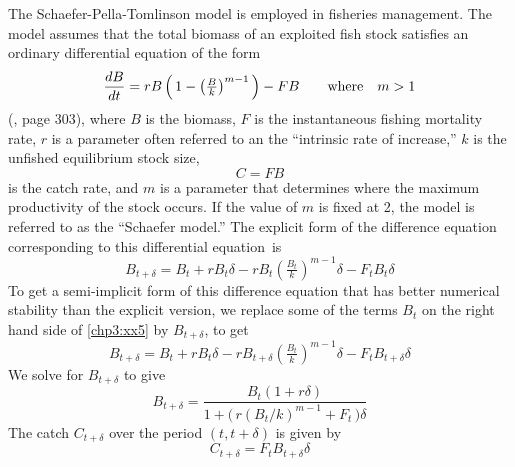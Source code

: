 \documentclass{admbmanual}
\begin{document}
The Schaefer-Pella-Tomlinson model is employed in fisheries management. The
model assumes that the total biomass of an exploited fish stock satisfies an
ordinary differential equation of the form
\begin{equation}
\frac{dB}{dt}=rB\left(\,1-\left(\tfrac{B}{k}\right)^{m-1}\,\right)
           - FB  \qquad \hbox{\rm where}\quad m>1
\label{chp3:xx3}
\end{equation}
(\cite{hilbornwalters1992}, page 303), where $B$ is the biomass, $F$ is the
instantaneous fishing mortality rate, $r$ is a parameter often referred to an
the ``intrinsic rate of increase,'' $k$ is the unfished equilibrium stock size,
\begin{equation}
  {C=FB}
\label{chp3:xx4}
\end{equation}
is the catch rate, and $m$ is a parameter that determines where the maximum
productivity of the stock occurs. If the value of $m$ is fixed at 2, the model
is referred to as the ``Schaefer model.'' The explicit form of the difference
equation corresponding to this differential equation~is
\begin{equation}
  {B_{t+\delta}=B_t+rB_t\delta-rB_t\left(\tfrac{B_t}{k}\right)^{m-1}\delta
     - F_tB_t\delta}
  \label{chp3:xx5}
\end{equation}
To get a semi-implicit form of this difference equation that has better
numerical stability than the explicit version, we replace some of the terms
$B_t$ on the right hand side of \ref{chp3:xx5} by $B_{t+\delta}$, to get
\begin{equation}
{B_{t+\delta}
   =B_t+rB_t\delta-rB_{t+\delta}\left(\tfrac{B_t}{k}\right)^{m-1}\delta
     - F_tB_{t+\delta}\delta}
 \label{chp3:xx6}
\end{equation}
We solve for $B_{t+\delta}$ to give
\begin{equation}
{B_{t+\delta}
   =\frac{B_t(1+r\delta)}{1+\big(\,r(B_t/k)^{m-1}+F_t\,\big)\delta}}
  \label{chp3:xx7}
\end{equation}
The catch $C_{t+\delta}$ over the period $(t,t+\delta)$ is given by
\begin{equation}
 {C_{t+\delta} =F_tB_{t+\delta}\delta }
  \label{chp3:xx8}
\end{equation}
\end{document}
